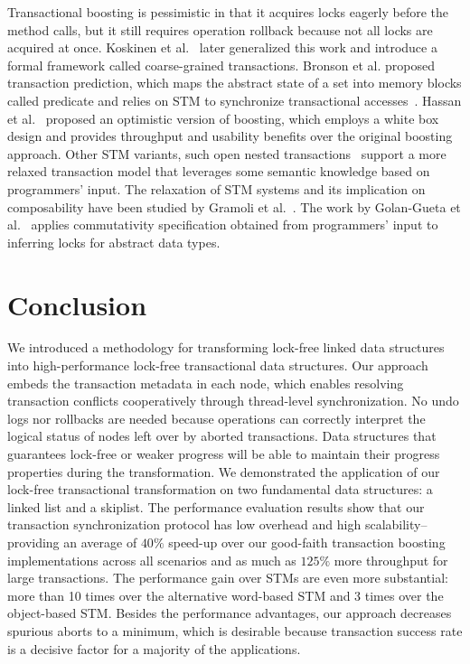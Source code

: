 \documentclass{sig-alternate-05-2015}
\begin{document}
Transactional boosting is pessimistic in that it acquires locks eagerly before the method calls, but it still requires operation rollback because not all locks are acquired at once.
Koskinen et al.~\cite{koskinen2010coarse} later generalized this work and introduce a formal framework called coarse-grained transactions.
Bronson et al. proposed transaction prediction, which maps the abstract state of a set into memory blocks called predicate and relies on STM to synchronize transactional accesses~\cite{bronson2010transactional}.
Hassan et al.~\cite{hassan2014developing} proposed an optimistic version of boosting, which employs a white box design and provides throughput and usability benefits over the original boosting approach.
Other STM variants, such open nested transactions~\cite{ni2007open} support a more relaxed transaction model that leverages some semantic knowledge based on programmers' input.
The relaxation of STM systems and its implication on composability have been studied by Gramoli et al.~\cite{gramoli2013composing}.
The work by Golan-Gueta et al.~\cite{golan2015automatic} applies commutativity specification obtained from programmers' input to inferring locks for abstract data types.
\section{Conclusion}
\label{sec:conclusion}
We introduced a methodology for transforming lock-free linked data structures into high-performance lock-free transactional data structures. 
Our approach embeds the transaction metadata in each node, which enables resolving transaction conflicts cooperatively through thread-level synchronization.
No undo logs nor rollbacks are needed because operations can correctly interpret the logical status of nodes left over by aborted transactions.
Data structures that guarantees lock-free or weaker progress will be able to maintain their progress properties during the transformation.
We demonstrated the application of our lock-free transactional transformation on two fundamental data structures: a linked list and a skiplist.  
The performance evaluation results show that our transaction synchronization protocol has low overhead and high scalability--providing an average of $40\%$ speed-up over our good-faith transaction boosting implementations across all scenarios and as much as $125\%$ more throughput for large transactions.
The performance gain over STMs are even more substantial: more than 10 times over the alternative word-based STM and 3 times over the object-based STM.
Besides the performance advantages, our approach decreases spurious aborts to a minimum, which is desirable because transaction success rate is a decisive factor for a majority of the applications.
\end{document}
